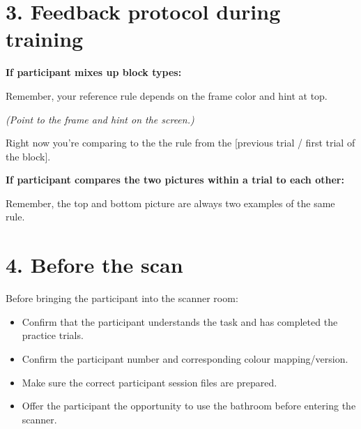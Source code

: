 \documentclass[11pt]{article}
\newcommand{\sayheader}{\textbf{\small\color{sayhead}}\par}
\begin{document}
\section*{3. Feedback protocol during training}




\noindent\textbf{If participant mixes up block types:}
\begin{saybox}
\sayheader
Remember, your reference rule depends on the frame color and hint at top.

\textit{(Point to the frame and hint on the screen.)}

Right now you're comparing to the the rule from the [previous trial / first trial of the block].
\end{saybox}

\noindent\textbf{If participant compares the two pictures within a trial to each other:}
\begin{saybox}
\sayheader
Remember, the top and bottom picture are always two examples of the same rule.
\end{saybox}


\section*{4. Before the scan}

Before bringing the participant into the scanner room:

\begin{itemize}[leftmargin=1.5em]
    \item Confirm that the participant understands the task and has completed the practice trials.

    \item Confirm the participant number and corresponding colour mapping/version.

    \item Make sure the correct participant session files are prepared.

    \item Offer the participant the opportunity to use the bathroom before entering the scanner.
\end{itemize}
\end{document}
